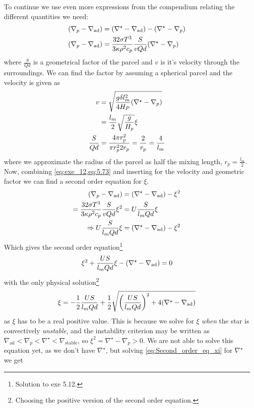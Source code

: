 \documentclass[11pt,a4paper,twocolumn,titlepage]{article}
\newcommand{\nablastb}
{
\nabla_{\text{stable}}
}
\newcommand{\nablaad}
{
\nabla_{\text{ad}}
}
\newcommand{\nablastar}
{
\nabla^\star
}
\newcommand{\nablap}
{
\nabla_{p}
}
\begin{document}
To continue we use even more expressions from the compendium relating the different quantities we need:
\begin{align}
\qty(\nablap-\nablaad) &= \qty(\nablastar-\nablaad) - \qty(\nablastar-\nablap) \label{eq:exe_12}
\\
\qty(\nablap-\nablaad) &= \frac{32\sigma T^3}{3\kappa\rho^2 c_p} \frac{S}{vQd}\qty(\nablastar-\nablap) \label{eq:5.73}
\end{align}
where $\frac{S}{Qd}$ is a geometrical factor of the parcel and $v$ is it's velocity through the surroundings. We can find the factor by assuming a spherical parcel and the velocity is given as
\begin{align*}
v &= \sqrt{\frac{g\delta l_m^2}{4H_P}\qty(\nablastar-\nablap)}
\\
&= \frac{l_m}{2}\sqrt{\frac{g}{H_p}}\xi
\\
\frac{S}{Qd} &= \frac{4\pi r_p^2}{\pi r_p^2 2r_p} = \frac{2}{r_p} = \frac{4}{l_m}
\end{align*}
where we approximate the radius of the parcel as half the mixing length, $r_p = \frac{l_m}{2}$. Now, combining \cref{eq:exe_12,eq:5.73} and inserting for the velocity and geometric factor we can find a second order equation for $\xi$.
\begin{align*}
\qty(\nablap-\nablaad) &= \qty(\nablastar-\nablaad) - \xi^2
\\
= \frac{32\sigma T^3}{3\kappa\rho^2 c_p} \frac{S}{vQd}\xi^2 &= U\frac{S}{l_mQd}\xi
\\
\Rightarrow U\frac{S}{l_mQd}\xi &= \qty(\nablastar-\nablaad) - \xi^2
\end{align*}
Which gives the second order equation\footnote{Solution to exe 5.12.}
\begin{equation}
\xi^2 + \frac{US}{l_mQd}\xi - \qty(\nablastar-\nablaad) = 0
\label{eq:Second_order_eq_xi}
\end{equation}
with the only physical solution\footnote{Choosing the positive version of the second order equation.}
\begin{align*}
\xi = -\frac{1}{2}\frac{US}{l_mQd} + \frac{1}{2}\sqrt{\qty(\frac{US}{l_mQd})^2 + 4\qty(\nablastar-\nablaad)}
\end{align*}
as $\xi$ has to be a real positive value. This is because we solve for $\xi$ \textit{when} the star is convectively \textit{unstable}, and the instability criterion may be written as ${\nablaad < \nablap < \nablastar < \nablastb}$, so ${\xi^2 = \nablastar -\nablap>0}$. We are not able to solve this equation yet, as we don't have $\nablastar$, but solving \cref{eq:Second_order_eq_xi} for $\nablastar$ we get
\end{document}
